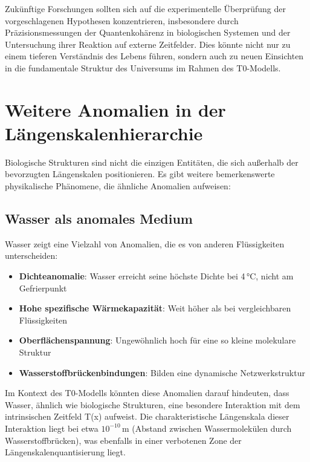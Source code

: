 \documentclass[12pt,a4paper]{article}
\newcommand{\Tfield}{T(x)}
\begin{document}
	Zukünftige Forschungen sollten sich auf die experimentelle Überprüfung der vorgeschlagenen Hypothesen konzentrieren, insbesondere durch Präzisions\-messungen der Quanten\-kohärenz in biologischen Systemen und der Untersuchung ihrer Reaktion auf externe Zeitfelder. Dies könnte nicht nur zu einem tieferen Verständnis des Lebens führen, sondern auch zu neuen Einsichten in die fundamentale Struktur des Universums im Rahmen des T0-Modells.
	
	\section{Weitere Anomalien in der Längenskalenhierarchie}
	\label{sec:weitere_anomalien}
	
	Biologische Strukturen sind nicht die einzigen Entitäten, die sich außerhalb der bevorzugten Längen\-skalen positionieren. Es gibt weitere bemerkenswerte physikalische Phänomene, die ähnliche Anomalien aufweisen:
	
	\subsection{Wasser als anomales Medium}
	\label{subsec:wasser_anomal}
	
	Wasser zeigt eine Vielzahl von Anomalien, die es von anderen Flüssigkeiten unterscheiden:
	
	\begin{itemize}
		\item \textbf{Dichteanomalie}: Wasser erreicht seine höchste Dichte bei 4\,°C, nicht am Gefrierpunkt
		\item \textbf{Hohe spezifische Wärmekapazität}: Weit höher als bei vergleichbaren Flüssigkeiten
		\item \textbf{Oberflächenspannung}: Ungewöhnlich hoch für eine so kleine molekulare Struktur
		\item \textbf{Wasserstoffbrückenbindungen}: Bilden eine dynamische Netzwerkstruktur
	\end{itemize}
	
	Im Kontext des T0-Modells könnten diese Anomalien darauf hindeuten, dass Wasser, ähnlich wie biologische Strukturen, eine besondere Interaktion mit dem intrinsischen Zeitfeld \Tfield{} aufweist. Die charakteristische Längen\-skala dieser Interaktion liegt bei etwa $10^{-10}$\,m (Abstand zwischen Wassermolekülen durch Wasserstoffbrücken), was ebenfalls in einer \glqq verbotenen Zone\grqq{} der Längen\-skalen\-quantisierung liegt.
	
\end{document}
